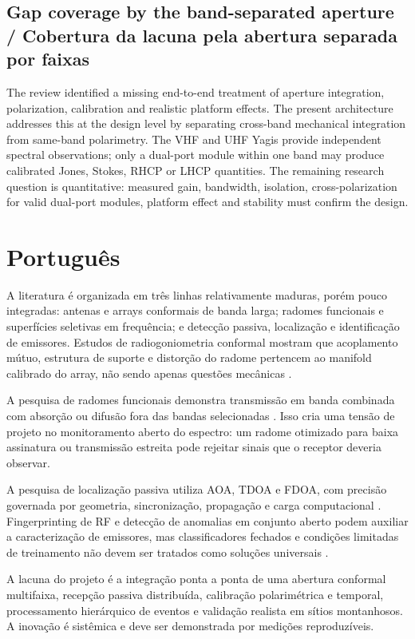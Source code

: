 \subsection*{Gap coverage by the band-separated aperture / Cobertura da lacuna pela abertura separada por faixas}
The review identified a missing end-to-end treatment of aperture integration, polarization, calibration and realistic platform effects. The present architecture addresses this at the design level by separating cross-band mechanical integration from same-band polarimetry. The VHF and UHF Yagis provide independent spectral observations; only a dual-port module within one band may produce calibrated Jones, Stokes, RHCP or LHCP quantities. The remaining research question is quantitative: measured gain, bandwidth, isolation, cross-polarization for valid dual-port modules, platform effect and stability must confirm the design.

\section*{Português}
A literatura é organizada em três linhas relativamente maduras, porém pouco integradas: antenas e arrays conformais de banda larga; radomes funcionais e superfícies seletivas em frequência; e detecção passiva, localização e identificação de emissores. Estudos de radiogoniometria conformal mostram que acoplamento mútuo, estrutura de suporte e distorção do radome pertencem ao manifold calibrado do array, não sendo apenas questões mecânicas \citep{caratelli2011,liberal2011}.

A pesquisa de radomes funcionais demonstra transmissão em banda combinada com absorção ou difusão fora das bandas selecionadas \citep{costa2012,lv2021,omar2018,sheng2024}. Isso cria uma tensão de projeto no monitoramento aberto do espectro: um radome otimizado para baixa assinatura ou transmissão estreita pode rejeitar sinais que o receptor deveria observar.

A pesquisa de localização passiva utiliza AOA, TDOA e FDOA, com precisão governada por geometria, sincronização, propagação e carga computacional \citep{liu2019,pine2021}. Fingerprinting de RF e detecção de anomalias em conjunto aberto podem auxiliar a caracterização de emissores, mas classificadores fechados e condições limitadas de treinamento não devem ser tratados como soluções universais \citep{soltanieh2020,jagannath2022,sun2022}.

A lacuna do projeto é a integração ponta a ponta de uma abertura conformal multifaixa, recepção passiva distribuída, calibração polarimétrica e temporal, processamento hierárquico de eventos e validação realista em sítios montanhosos. A inovação é sistêmica e deve ser demonstrada por medições reproduzíveis.

